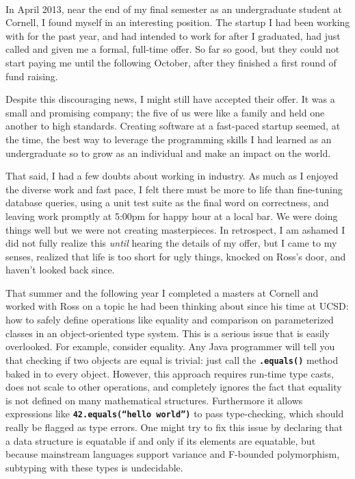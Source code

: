 \documentclass{article}
\newcommand{\mono}[1]{\textbf{\texttt{#1}}}
\renewcommand\maketitle{
{\flushleft{\textsf{%
Ben Greenman
\hfill
DRAFT: NSF Technical Background
}}\\
\hrulefill}
}
\begin{document}
\maketitle

In April 2013, near the end of my final semester as an undergraduate student at Cornell, I found myself in an interesting position.
The startup I had been working with for the past year, and had intended to work for after I graduated, had just called and given me a formal, full-time offer.
So far so good, but they could not start paying me until the following October, after they finished a first round of fund raising.

Despite this discouraging news, I might still have accepted their offer.
It was a small and promising company; the five of us were like a family and held one another to high standards.
Creating software at a fast-paced startup seemed, at the time, the best way to leverage the programming skills I had learned as an undergraduate so to grow as an individual and make an impact on the world.

That said, I had a few doubts about working in industry.
As much as I enjoyed the diverse work and fast pace, I felt there must be more to life than fine-tuning database queries, using a unit test suite as the final word on correctness, and leaving work promptly at 5:00pm for happy hour at a local bar.
We were doing things well but we were not creating masterpieces.
In retrospect, I am ashamed I did not fully realize this \emph{until} hearing the details of my offer, but I came to my senses, realized that life is too short for ugly things, knocked on Ross's door, and haven't looked back since.

\vspace{0.5cm}

That summer and the following year I completed a masters at Cornell and worked with Ross on a topic he had been thinking about since his time at UCSD: how to safely define operations like equality and comparison on parameterized classes in an object-oriented type system.
This is a serious issue that is easily overlooked.
For example, consider equality.
Any Java programmer will tell you that checking if two objects are equal is trivial: just call the \mono{.equals()} method baked in to every object.
However, this approach requires run-time type casts, does not scale to other operations, and completely ignores the fact that equality is not defined on many mathematical structures.
Furthermore it allows expressions like \mono{42.equals(``hello world'')} to pass type-checking, which should really be flagged as type errors.
One might try to fix this issue by declaring that a data structure is equatable if and only if its elements are equatable, but because mainstream languages support variance and F-bounded polymorphism, subtyping with these types is undecidable.
\end{document}
